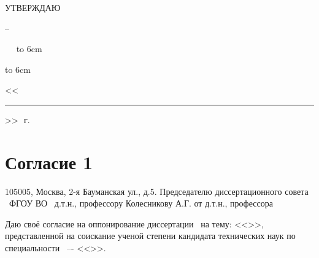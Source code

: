 
\hfill\parbox{6cm}{
	\centerline{УТВЕРЖДАЮ}
	\centerline{\leadingOrganizationHeadPos\---}
	\leadingOrganizationTitle
	
	\ktn~\leadingOrganizationHead\
	\linebreak
	{\hbox to 6cm{\hrulefill}}
	{\hbox to 6cm{<<\rule{7mm}{0.4pt}>>\hrulefill~\number\year\,г.}}}
\vspace{0.5cm}


\section{Согласие 1}



105005, Москва, 2-я Бауманская ул., д.5.
Председателю диссертационного совета \
ФГОУ ВО \thesisOrganizationShort\
д.т.н., профессору Колесникову А.Г.
от д.т.н., профессора \opponentOneWhomFioShort





Даю своё согласие на оппонирование диссертации \thesisAuthorLastNameFromFull\ на тему: <<\thesisTitle>>, представленной на соискание ученой степени кандидата технических наук по специальности \thesisSpecialtyNumber\ –- <<\thesisSpecialtyTitle>>.





\opponentOneRegalia\		\opponentOneFio


\clearpage





